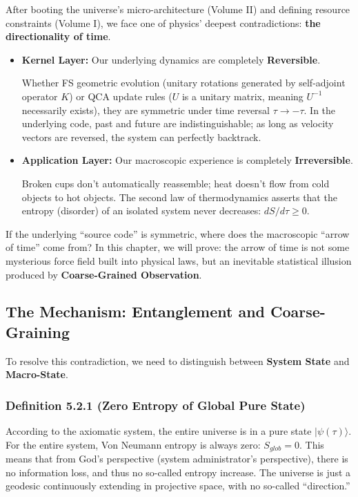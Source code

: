 \documentclass[11pt,a4paper,twoside]{book}
\begin{document}
After booting the universe's micro-architecture (Volume II) and defining resource constraints (Volume I), we face one of physics' deepest contradictions: \textbf{the directionality of time}.

\begin{itemize}
\item \textbf{Kernel Layer:} Our underlying dynamics are completely \textbf{Reversible}.

    Whether FS geometric evolution (unitary rotations generated by self-adjoint operator $K$) or QCA update rules ($U$ is a unitary matrix, meaning $U^{-1}$ necessarily exists), they are symmetric under time reversal $\tau \to -\tau$. In the underlying code, past and future are indistinguishable; as long as velocity vectors are reversed, the system can perfectly backtrack.

\item \textbf{Application Layer:} Our macroscopic experience is completely \textbf{Irreversible}.

    Broken cups don't automatically reassemble; heat doesn't flow from cold objects to hot objects. The second law of thermodynamics asserts that the entropy (disorder) of an isolated system never decreases: $dS/d\tau \ge 0$.
\end{itemize}

If the underlying ``source code'' is symmetric, where does the macroscopic ``arrow of time'' come from? In this chapter, we will prove: the arrow of time is not some mysterious force field built into physical laws, but an inevitable statistical illusion produced by \textbf{Coarse-Grained Observation}.

\subsection{The Mechanism: Entanglement and Coarse-Graining}

To resolve this contradiction, we need to distinguish between \textbf{System State} and \textbf{Macro-State}.

\subsubsection{Definition 5.2.1 (Zero Entropy of Global Pure State)}

According to the axiomatic system, the entire universe is in a pure state $|\psi(\tau)\rangle$. For the entire system, Von Neumann entropy is always zero: $S_{glob} = 0$. This means that from God's perspective (system administrator's perspective), there is no information loss, and thus no so-called entropy increase. The universe is just a geodesic continuously extending in projective space, with no so-called ``direction.''
\end{document}
